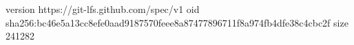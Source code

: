 version https://git-lfs.github.com/spec/v1
oid sha256:bc46e5a13cc8efe0aad9187570feee8a87477896711f8a974fb4dfe38c4cbc2f
size 241282
